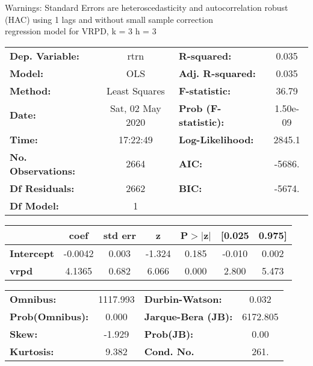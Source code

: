 Warnings: \newline
 [1] Standard Errors are heteroscedasticity and autocorrelation robust (HAC) using 1 lags and without small sample correction\\ 

regression model for VRPD, k = 3 h = 3\begin{center}
\begin{tabular}{lclc}
\toprule
\textbf{Dep. Variable:}    &       rtrn       & \textbf{  R-squared:         } &     0.035   \\
\textbf{Model:}            &       OLS        & \textbf{  Adj. R-squared:    } &     0.035   \\
\textbf{Method:}           &  Least Squares   & \textbf{  F-statistic:       } &     36.79   \\
\textbf{Date:}             & Sat, 02 May 2020 & \textbf{  Prob (F-statistic):} &  1.50e-09   \\
\textbf{Time:}             &     17:22:49     & \textbf{  Log-Likelihood:    } &    2845.1   \\
\textbf{No. Observations:} &        2664      & \textbf{  AIC:               } &    -5686.   \\
\textbf{Df Residuals:}     &        2662      & \textbf{  BIC:               } &    -5674.   \\
\textbf{Df Model:}         &           1      & \textbf{                     } &             \\
\bottomrule
\end{tabular}
\begin{tabular}{lcccccc}
                   & \textbf{coef} & \textbf{std err} & \textbf{z} & \textbf{P$> |$z$|$} & \textbf{[0.025} & \textbf{0.975]}  \\
\midrule
\textbf{Intercept} &      -0.0042  &        0.003     &    -1.324  &         0.185        &       -0.010    &        0.002     \\
\textbf{vrpd}      &       4.1365  &        0.682     &     6.066  &         0.000        &        2.800    &        5.473     \\
\bottomrule
\end{tabular}
\begin{tabular}{lclc}
\textbf{Omnibus:}       & 1117.993 & \textbf{  Durbin-Watson:     } &    0.032  \\
\textbf{Prob(Omnibus):} &   0.000  & \textbf{  Jarque-Bera (JB):  } & 6172.805  \\
\textbf{Skew:}          &  -1.929  & \textbf{  Prob(JB):          } &     0.00  \\
\textbf{Kurtosis:}      &   9.382  & \textbf{  Cond. No.          } &     261.  \\
\bottomrule
\end{tabular}
\end{center}

